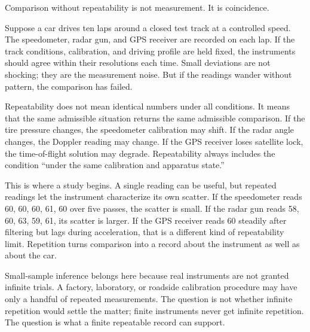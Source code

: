 Comparison without repeatability is not measurement. It is coincidence.

Suppose a car drives ten laps around a closed test track at a controlled speed.
The speedometer, radar gun, and GPS receiver are recorded on each lap. If the
track conditions, calibration, and driving profile are held fixed, the
instruments should agree within their resolutions each time. Small deviations
are not shocking; they are the measurement noise. But if the readings wander
without pattern, the comparison has failed.

Repeatability does not mean identical numbers under all conditions. It means
that the same admissible situation returns the same admissible comparison. If
the tire pressure changes, the speedometer calibration may shift. If the radar
angle changes, the Doppler reading may change. If the GPS receiver loses
satellite lock, the time-of-flight solution may degrade. Repeatability always
includes the condition ``under the same calibration and apparatus state.''

This is where a study begins. A single reading can be useful, but repeated
readings let the instrument characterize its own scatter. If the speedometer
reads 60, 60, 60, 61, 60 over five passes, the scatter is small. If the radar
gun reads 58, 60, 63, 59, 61, its scatter is larger. If the GPS receiver reads
60 steadily after filtering but lags during acceleration, that is a different
kind of repeatability limit. Repetition turns comparison into a record about the
instrument as well as about the car.

Small-sample inference belongs here because real instruments are not granted
infinite trials. A factory, laboratory, or roadside calibration procedure may
have only a handful of repeated measurements. The question is not whether
infinite repetition would settle the matter; finite instruments never get
infinite repetition. The question is what a finite repeatable record can
support.

